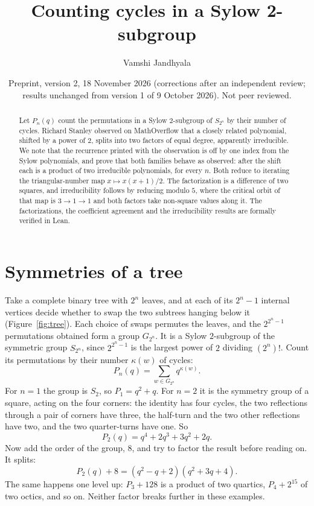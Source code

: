 \documentclass[11pt]{article}
\title{Counting cycles in a Sylow 2-subgroup}
\author{Vamshi Jandhyala}
\date{Preprint, version 2, 18 November 2026 (corrections after an independent review; results unchanged from version 1 of 9 October 2026). Not peer reviewed.}
\theoremstyle{remark}
\begin{document}
\maketitle
\vspace{-2em}

\begin{abstract}
Let $P_n(q)$ count the permutations in a Sylow $2$-subgroup of $S_{2^n}$ by their number of cycles. Richard Stanley observed on MathOverflow that a closely related polynomial, shifted by a power of $2$, splits into two factors of equal degree, apparently irreducible. We note that the recurrence printed with the observation is off by one index from the Sylow polynomials, and prove that both families behave as observed: after the shift each is a product of two irreducible polynomials, for every $n$. Both reduce to iterating the triangular-number map $x\mapsto x(x+1)/2$. The factorization is a difference of two squares, and irreducibility follows by reducing modulo $5$, where the critical orbit of that map is $3\to1\to1$ and both factors take non-square values along it. The factorizations, the coefficient agreement and the irreducibility results are formally verified in Lean.
\end{abstract}

\section{Symmetries of a tree}

Take a complete binary tree with $2^n$ leaves, and at each of its $2^n-1$ internal vertices decide whether to swap the two subtrees hanging below it (Figure~\ref{fig:tree}). Each choice of swaps permutes the leaves, and the $2^{2^n-1}$ permutations obtained form a group $G_{2^n}$. It is a Sylow $2$-subgroup of the symmetric group $S_{2^n}$, since $2^{2^n-1}$ is the largest power of $2$ dividing $(2^n)!$. Count its permutations by their number $\kappa(w)$ of cycles:
\[
P_n(q)=\sum_{w\in G_{2^n}}q^{\kappa(w)}.
\]
For $n=1$ the group is $S_2$, so $P_1=q^2+q$. For $n=2$ it is the symmetry group of a square, acting on the four corners: the identity has four cycles, the two reflections through a pair of corners have three, the half-turn and the two other reflections have two, and the two quarter-turns have one. So
\[
P_2(q)=q^4+2q^3+3q^2+2q .
\]
Now add the order of the group, $8$, and try to factor the result before reading on. It splits:
\[
P_2(q)+8=(q^2-q+2)(q^2+3q+4).
\]
The same happens one level up: $P_3+128$ is a product of two quartics, $P_4+2^{15}$ of two octics, and so on. Neither factor breaks further in these examples.
\end{document}
